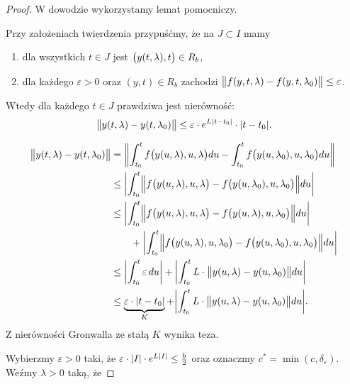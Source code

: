 \begin{proof}
  W dowodzie wykorzystamy lemat pomocniczy.
%
  \begin{nestedlemma} \label{L: Kluczowy}
%
    Przy założeniach twierdzenia przypuśćmy, że na $J \subset I$ mamy
%
    \begin{enumerate}
      \item dla wszystkich $t \in J$ jest $\p[\big]{y(t,\lambda),t} \in R_b$,
      \item dla każdego $\varepsilon > 0$ oraz $(y,t) \in R_b$ zachodzi
      $ \norm[\big]{ f(y,t,\lambda) - f(y,t,\lambda_0) } \leq \varepsilon $.
    \end{enumerate}
%
    Wtedy dla każdego $t \in J$ prawdziwa jest nierówność:
%
    \begin{equation*}
      \norm[\big]{ y(t,\lambda) - y(t,\lambda_0) } \leq \varepsilon \cdot e^{L \abs{t-t_0}} \cdot \abs{t-t_0}.
    \end{equation*}
%
  \end{nestedlemma}
%
  \begin{nestedproof}
%
    \begin{align*}
      \norm[\big]{ y(t,\lambda) - y(t,\lambda_0) }
      &= \norm*{ \int_{t_0}^t f \p[\big]{ y(u, \lambda), u, \lambda } du - 
          \int_{t_0}^t f\p[\big]{ y(u,\lambda_0), u, \lambda_0 } du} \\
      &\leq \abs*{ \int_{t_0}^t \norm[\Big]{ f \p[\big]{ y(u,\lambda), u, \lambda } - 
          f\p[\big]{ y(u,\lambda_0), u, \lambda_0 } } du } \\
      &\leq \abs*{ \int_{t_0}^t \norm[\Big]{ f \p[\big]{ y(u,\lambda), u, \lambda } - 
          f\p[\big]{ y(u,\lambda), u, \lambda_0 } } du } \\
      &\qquad+ \abs*{ \int_{t_0}^t \norm[\Big]{ f \p[\big]{ y(u,\lambda), u, \lambda_0 } - 
          f\p[\big]{ y(u,\lambda_0), u, \lambda_0 } } du } \\
      &\leq \abs*{\int_{t_0}^t \varepsilon \, du} + 
          \abs*{ \int_{t_0}^t L \cdot \norm[\big]{ y(u,\lambda) - y(u,\lambda_0) } du } \\
      &\leq \underbrace{\varepsilon \cdot \abs*{t-t_0}}_K + 
          \abs*{ \int_{t_0}^t L \cdot \norm[\big]{ y(u,\lambda) - y(u,\lambda_0) } du }.
    \end{align*}
%
    Z nierówności Gronwalla ze stałą $K$ wynika teza.
%
  \end{nestedproof}
%
  Wybierzmy $\varepsilon > 0$ taki, że $\varepsilon \cdot \abs{I} \cdot e^{L \abs{I}} \leq \frac b2$
  oraz oznaczmy $c^{\ast} = \min(c,\delta_{\varepsilon})$. Weźmy $\lambda > 0$ taką, że

\end{proof}
